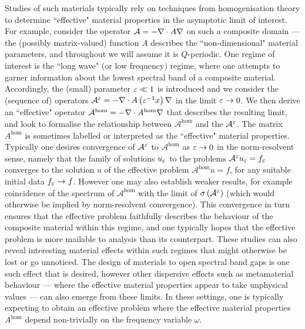 Studies of such materials typically rely on techniques from homogenisation theory to determine ``effective" material properties in the asymptotic limit of interest.
For example, consider the operator $\mathcal{A}=-\nabla\cdot A\nabla$ on such a composite domain --- the (possibly matrix-valued) function $A$ describes the ``non-dimensional" material parameters, and throughout we will assume it is $Q$-periodic.
One regime of interest is the ``long wave" (or low frequency) regime, where one attempts to garner information about the lowest spectral band of a composite material.
Accordingly, the (small) parameter $\varepsilon\ll 1$ is introduced and we consider the (sequence of) operators $\mathcal{A}^{\varepsilon} = -\nabla\cdot A\left( \varepsilon^{-1}x \right)\nabla$ in the limit $\varepsilon\rightarrow0$.
We then derive an ``effective" operator $\mathcal{A}^{\mathrm{hom}} = -\nabla\cdot A^{\mathrm{hom}}\nabla$ that describes the resulting limit, and look to formalise the relationship between $\mathcal{A}^{\mathrm{hom}}$ and the $\mathcal{A}^{\varepsilon}$.
The matrix $A^{\mathrm{hom}}$ is sometimes labelled or interpreted as the ``effective" material properties.
Typically one desires convergence of $\mathcal{A}^{\varepsilon}$ to $\mathcal{A}^{\mathrm{hom}}$ as $\varepsilon\rightarrow0$ in the norm-resolvent sense, namely that the family of solutions $u_{\varepsilon}$ to the problems $\mathcal{A}^{\varepsilon}u_{\varepsilon}=f_{\varepsilon}$ converges to the solution $u$ of the effective problem $\mathcal{A}^{\mathrm{hom}}u = f$, for any suitable initial data $f_{\varepsilon}\rightarrow f$.
However one may also establish weaker results, for example coincidence of the spectrum of $\mathcal{A}^{\mathrm{hom}}$ with the limit of $\sigma\left( \mathcal{A}^{\varepsilon} \right)$  (which would otherwise be implied by norm-resolvent convergence).
This convergence in turn ensures that the effective problem faithfully describes the behaviour of the composite material within this regime, and one typically hopes that the effective problem is more mailable to analysis than its counterpart.
These studies can also reveal interesting material effects within such regimes that might otherwise be lost or go unnoticed.
The design of materials to open spectral band gaps is one such effect that is desired, however other dispersive effects such as metamaterial behaviour  --- where the effective material properties appear to take unphysical values --- can also emerge from these limits.
In these settings, one is typically expecting to obtain an effective problem where the effective material properties $A^{\mathrm{hom}}$ depend non-trivially on the frequency variable $\omega$.

